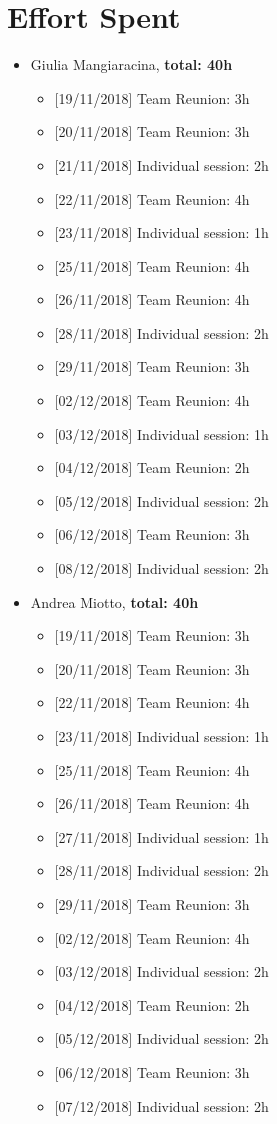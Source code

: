 \chapter{Effort Spent}

\begin{itemize}
\item Giulia Mangiaracina, \textbf{total: 40h} 
\begin{itemize}
    \item {[}19/11/2018{]} Team Reunion: 3h
    \item {[}20/11/2018{]} Team Reunion: 3h
    \item {[}21/11/2018{]} Individual session: 2h
    \item {[}22/11/2018{]} Team Reunion: 4h
    \item {[}23/11/2018{]} Individual session: 1h
    \item {[}25/11/2018{]} Team Reunion: 4h
    \item {[}26/11/2018{]} Team Reunion: 4h
    \item {[}28/11/2018{]} Individual session: 2h
    \item {[}29/11/2018{]} Team Reunion: 3h
    \item {[}02/12/2018{]} Team Reunion: 4h
    \item {[}03/12/2018{]} Individual session: 1h
    \item {[}04/12/2018{]} Team Reunion: 2h
    \item {[}05/12/2018{]} Individual session: 2h
    \item {[}06/12/2018{]} Team Reunion: 3h
    \item {[}08/12/2018{]} Individual session: 2h
\end{itemize}

\item Andrea Miotto, \textbf{total: 40h} 
\begin{itemize}
     \item {[}19/11/2018{]} Team Reunion: 3h
    \item {[}20/11/2018{]} Team Reunion: 3h
    \item {[}22/11/2018{]} Team Reunion: 4h
    \item {[}23/11/2018{]} Individual session: 1h
    \item {[}25/11/2018{]} Team Reunion: 4h
    \item {[}26/11/2018{]} Team Reunion: 4h
    \item {[}27/11/2018{]} Individual session: 1h
    \item {[}28/11/2018{]} Individual session: 2h
    \item {[}29/11/2018{]} Team Reunion: 3h
    \item {[}02/12/2018{]} Team Reunion: 4h
    \item {[}03/12/2018{]} Individual session: 2h
    \item {[}04/12/2018{]} Team Reunion: 2h
    \item {[}05/12/2018{]} Individual session: 2h
    \item {[}06/12/2018{]} Team Reunion: 3h
    \item {[}07/12/2018{]} Individual session: 2h
\end{itemize}


\end{itemize}
